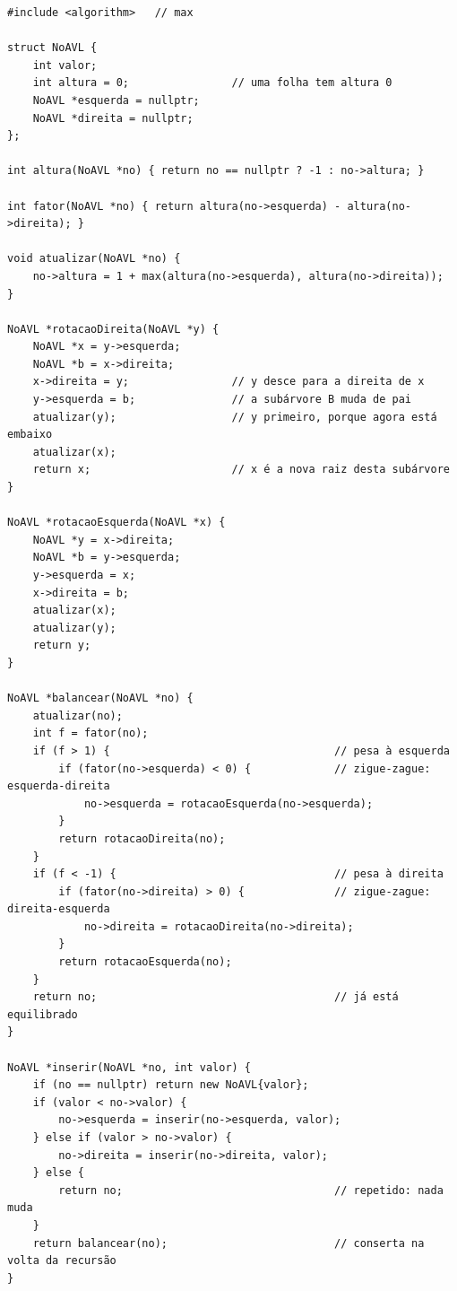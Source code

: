\begin{codigo}
\begin{Verbatim}[breaklines=true, breaksymbolleft={}, fontsize=\footnotesize]
#include <algorithm>   // max

struct NoAVL {
    int valor;
    int altura = 0;                // uma folha tem altura 0
    NoAVL *esquerda = nullptr;
    NoAVL *direita = nullptr;
};

int altura(NoAVL *no) { return no == nullptr ? -1 : no->altura; }

int fator(NoAVL *no) { return altura(no->esquerda) - altura(no->direita); }

void atualizar(NoAVL *no) {
    no->altura = 1 + max(altura(no->esquerda), altura(no->direita));
}

NoAVL *rotacaoDireita(NoAVL *y) {
    NoAVL *x = y->esquerda;
    NoAVL *b = x->direita;
    x->direita = y;                // y desce para a direita de x
    y->esquerda = b;               // a subárvore B muda de pai
    atualizar(y);                  // y primeiro, porque agora está embaixo
    atualizar(x);
    return x;                      // x é a nova raiz desta subárvore
}

NoAVL *rotacaoEsquerda(NoAVL *x) {
    NoAVL *y = x->direita;
    NoAVL *b = y->esquerda;
    y->esquerda = x;
    x->direita = b;
    atualizar(x);
    atualizar(y);
    return y;
}

NoAVL *balancear(NoAVL *no) {
    atualizar(no);
    int f = fator(no);
    if (f > 1) {                                   // pesa à esquerda
        if (fator(no->esquerda) < 0) {             // zigue-zague: esquerda-direita
            no->esquerda = rotacaoEsquerda(no->esquerda);
        }
        return rotacaoDireita(no);
    }
    if (f < -1) {                                  // pesa à direita
        if (fator(no->direita) > 0) {              // zigue-zague: direita-esquerda
            no->direita = rotacaoDireita(no->direita);
        }
        return rotacaoEsquerda(no);
    }
    return no;                                     // já está equilibrado
}

NoAVL *inserir(NoAVL *no, int valor) {
    if (no == nullptr) return new NoAVL{valor};
    if (valor < no->valor) {
        no->esquerda = inserir(no->esquerda, valor);
    } else if (valor > no->valor) {
        no->direita = inserir(no->direita, valor);
    } else {
        return no;                                 // repetido: nada muda
    }
    return balancear(no);                          // conserta na volta da recursão
}


\end{Verbatim}
\end{codigo}
